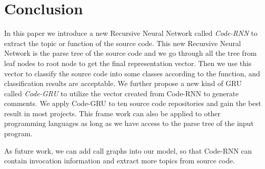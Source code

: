 \section{Conclusion}

In this paper we introduce a new Recursive Neural Network called \emph{Code-RNN} to extract the topic or function of the source code. This new Recursive Neural Network is the parse tree of the source code and we go through all the tree from leaf nodes to root node to get the final representation vector. Then we use this vector to classify the source code into some classes according to the function, and classification results are acceptable. 
We further propose a new kind of GRU called \emph{Code-GRU} to utilize the vector created from Code-RNN to generate comments. We apply Code-GRU to ten source code repositories and gain the best result in most projects.
This frame work can also be applied to other programming languages as long as we have access to the parse tree of the input program.


As future work, we can add call graphs into our model,
so that Code-RNN can contain invocation information and extract more topics
from source code.
